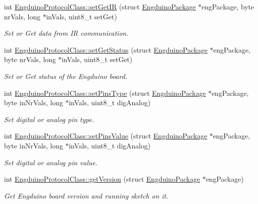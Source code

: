 \begin{DoxyCompactItemize}
int \hyperlink{group___engduino_protocol_ga04358743c2b3e13ff61eb072d57e782a}{Engduino\+Protocol\+Class\+::set\+Get\+I\+R} (struct \hyperlink{struct_engduino_package}{Engduino\+Package} $\ast$eng\+Package, byte nr\+Vals, long $\ast$in\+Vals, uint8\+\_\+t set\+Get)
\begin{DoxyCompactList}\small\item\em Set or Get data from I\+R communication. \end{DoxyCompactList}\item 
int \hyperlink{group___engduino_protocol_gac1faeb0dc90fcacd10ee643c3a45f82f}{Engduino\+Protocol\+Class\+::set\+Get\+Status} (struct \hyperlink{struct_engduino_package}{Engduino\+Package} $\ast$eng\+Package, byte nr\+Vals, long $\ast$in\+Vals, uint8\+\_\+t set\+Get)
\begin{DoxyCompactList}\small\item\em Set or Get status of the Engduino board. \end{DoxyCompactList}\item 
int \hyperlink{group___engduino_protocol_ga03a85a36fca38e5841424db6efd8cd17}{Engduino\+Protocol\+Class\+::set\+Pins\+Type} (struct \hyperlink{struct_engduino_package}{Engduino\+Package} $\ast$eng\+Package, byte in\+Nr\+Vals, long $\ast$in\+Vals, uint8\+\_\+t dig\+Analog)
\begin{DoxyCompactList}\small\item\em Set digital or analog pin type. \end{DoxyCompactList}\item 
int \hyperlink{group___engduino_protocol_gad39688bc052b473389917ef7daa6f0f2}{Engduino\+Protocol\+Class\+::set\+Pins\+Value} (struct \hyperlink{struct_engduino_package}{Engduino\+Package} $\ast$eng\+Package, byte in\+Nr\+Vals, long $\ast$in\+Vals, uint8\+\_\+t dig\+Analog)
\begin{DoxyCompactList}\small\item\em Set digital or analog pin value. \end{DoxyCompactList}\item 
int \hyperlink{group___engduino_protocol_gad585cd4ca7ea413a137fe5783825a612}{Engduino\+Protocol\+Class\+::get\+Version} (struct \hyperlink{struct_engduino_package}{Engduino\+Package} $\ast$eng\+Package)
\begin{DoxyCompactList}\small\item\em Get Engduino board version and running sketch on it. \end{DoxyCompactList}\item 

\end{DoxyCompactItemize}
